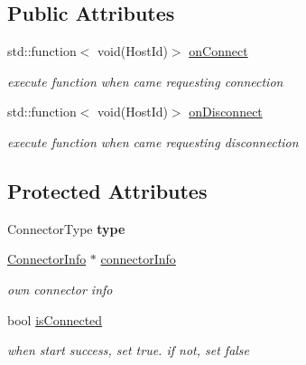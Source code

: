 \subsection*{Public Attributes}
\begin{DoxyCompactItemize}
\item 
std\+::function$<$ void(Host\+Id)$>$ \mbox{\hyperlink{class_c_g_1_1_base_connector_a458c5e8376f9961d03a37624ad8f3ed6}{on\+Connect}}
\begin{DoxyCompactList}\small\item\em execute function when came requesting connection \end{DoxyCompactList}\item 
std\+::function$<$ void(Host\+Id)$>$ \mbox{\hyperlink{class_c_g_1_1_base_connector_ac33259324e8654e0e89762a723fddbb0}{on\+Disconnect}}
\begin{DoxyCompactList}\small\item\em execute function when came requesting disconnection \end{DoxyCompactList}\end{DoxyCompactItemize}
\subsection*{Protected Attributes}
\begin{DoxyCompactItemize}
\item 
\mbox{\label{class_c_g_1_1_base_connector_a58b97c8c461511d26d9305c5d09c2816}} 
Connector\+Type {\bfseries type}
\item 
\mbox{\label{class_c_g_1_1_base_connector_ae68321ba56404549f2e655238035ed8d}} 
\mbox{\hyperlink{class_c_g_1_1_connector_info}{Connector\+Info}} $\ast$ \mbox{\hyperlink{class_c_g_1_1_base_connector_ae68321ba56404549f2e655238035ed8d}{connector\+Info}}
\begin{DoxyCompactList}\small\item\em own connector info \end{DoxyCompactList}\item 
\mbox{\label{class_c_g_1_1_base_connector_af13a9d2d208f81d46dc6d5b9c3b77e33}} 
bool \mbox{\hyperlink{class_c_g_1_1_base_connector_af13a9d2d208f81d46dc6d5b9c3b77e33}{is\+Connected}}
\begin{DoxyCompactList}\small\item\em when start success, set true. if not, set false \end{DoxyCompactList}\end{DoxyCompactItemize}
